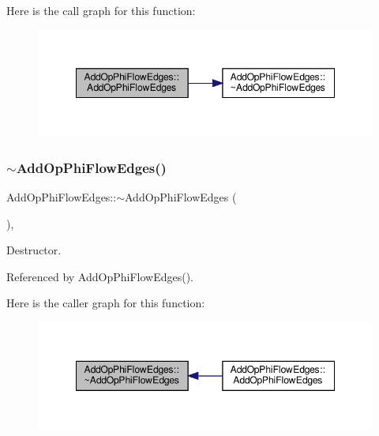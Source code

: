 Here is the call graph for this function\+:
\nopagebreak
\begin{figure}[H]
\begin{center}
\leavevmode
\includegraphics[width=348pt]{dd/dfd/classAddOpPhiFlowEdges_a3347740ebc741fae8e3d85f173676cab_cgraph}
\end{center}
\end{figure}
\mbox{\label{classAddOpPhiFlowEdges_a0f56a3be83495ec8867e57f299c744f4}} 
\subsubsection{\texorpdfstring{$\sim$\+Add\+Op\+Phi\+Flow\+Edges()}{~AddOpPhiFlowEdges()}}
{\footnotesize\ttfamily Add\+Op\+Phi\+Flow\+Edges\+::$\sim$\+Add\+Op\+Phi\+Flow\+Edges (\begin{DoxyParamCaption}{ }\end{DoxyParamCaption})\hspace{0.3cm}{\ttfamily [override]}, {\ttfamily [default]}}



Destructor. 



Referenced by Add\+Op\+Phi\+Flow\+Edges().

Here is the caller graph for this function\+:
\nopagebreak
\begin{figure}[H]
\begin{center}
\leavevmode
\includegraphics[width=348pt]{dd/dfd/classAddOpPhiFlowEdges_a0f56a3be83495ec8867e57f299c744f4_icgraph}
\end{center}
\end{figure}


